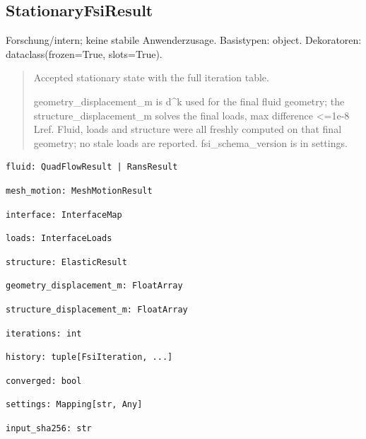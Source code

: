 \subsection{StationaryFsiResult}
Forschung/intern; keine stabile Anwenderzusage.
Basistypen: object. Dekoratoren: dataclass(frozen=True, slots=True).
\begin{quote}
Accepted stationary state with the full iteration table.\par geometry\_displacement\_m is d\textasciicircum{}k used for the final fluid geometry; the structure\_displacement\_m solves the final loads, max difference <=1e-8 Lref. Fluid, loads and structure were all freshly computed on that final geometry; no stale loads are reported. fsi\_schema\_version is in settings.
\end{quote}
\begin{lstlisting}
fluid: QuadFlowResult | RansResult
\end{lstlisting}
\begin{lstlisting}
mesh_motion: MeshMotionResult
\end{lstlisting}
\begin{lstlisting}
interface: InterfaceMap
\end{lstlisting}
\begin{lstlisting}
loads: InterfaceLoads
\end{lstlisting}
\begin{lstlisting}
structure: ElasticResult
\end{lstlisting}
\begin{lstlisting}
geometry_displacement_m: FloatArray
\end{lstlisting}
\begin{lstlisting}
structure_displacement_m: FloatArray
\end{lstlisting}
\begin{lstlisting}
iterations: int
\end{lstlisting}
\begin{lstlisting}
history: tuple[FsiIteration, ...]
\end{lstlisting}
\begin{lstlisting}
converged: bool
\end{lstlisting}
\begin{lstlisting}
settings: Mapping[str, Any]
\end{lstlisting}
\begin{lstlisting}
input_sha256: str
\end{lstlisting}
